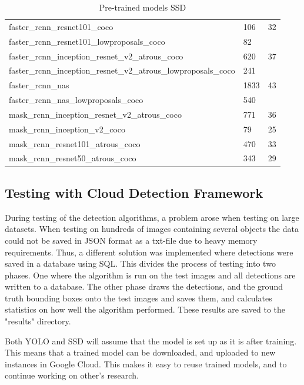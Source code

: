 \begin{table}[h!]
\begin{tabular}{lll}
faster\_rcnn\_resnet101\_coco                                   & 106         & 32                                \\
faster\_rcnn\_resnet101\_lowproposals\_coco                     & 82          &                                   \\
faster\_rcnn\_inception\_resnet\_v2\_atrous\_coco               & 620         & 37                                \\
faster\_rcnn\_inception\_resnet\_v2\_atrous\_lowproposals\_coco & 241         &                                   \\
faster\_rcnn\_nas                                               & 1833        & 43                                \\
faster\_rcnn\_nas\_lowproposals\_coco                           & 540         &                                   \\
mask\_rcnn\_inception\_resnet\_v2\_atrous\_coco                 & 771         & 36                                \\
mask\_rcnn\_inception\_v2\_coco                                 & 79          & 25                                \\
mask\_rcnn\_resnet101\_atrous\_coco                             & 470         & 33                                \\
mask\_rcnn\_resnet50\_atrous\_coco                              & 343         & 29                               
\end{tabular}
\caption{Pre-trained models SSD}
\label{ssd_tab}
\end{table}


\newpage

\subsection{Testing with Cloud Detection Framework}
During testing of the detection algorithms, a problem arose when testing on large datasets. When testing on hundreds of images containing several objects the data could not be saved in JSON format as a txt-file due to heavy memory requirements. Thus, a different solution was implemented where detections were saved in a database using SQL. This divides the process of testing into two phases. One where the algorithm is run on the test images and all detections are written to a database. The other phase draws the detections, and the ground truth bounding boxes onto the test images and saves them, and calculates statistics on how well the algorithm performed. These results are saved to the "results" directory.

\vspace{3mm}

Both YOLO and SSD will assume that the model is set up as it is after training. This means that a trained model can be downloaded, and uploaded to new instances in Google Cloud. This makes it easy to reuse trained models, and to continue working on other's research.









\cleardoublepage